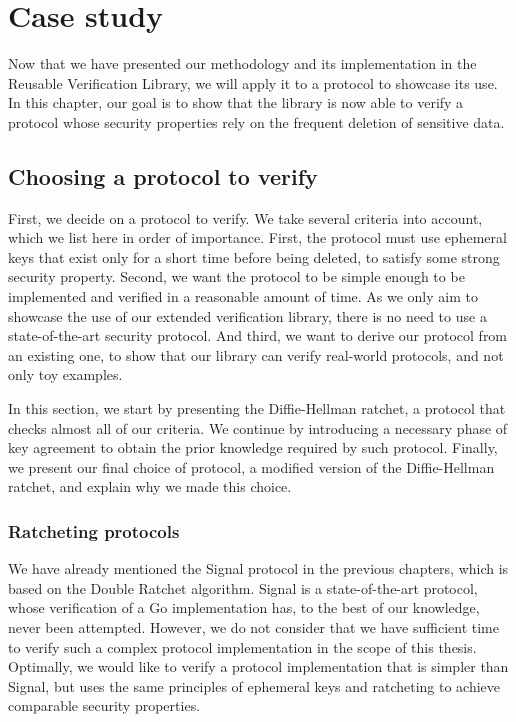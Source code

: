 
\chapter{Case study}
\label{chap:case-study}

Now that we have presented our methodology and its implementation in the Reusable Verification Library, we will apply it to a protocol to showcase its use. 
In this chapter, our goal is to show that the library is now able to verify a protocol whose security properties rely on the frequent deletion of sensitive data.


\section{Choosing a protocol to verify}
\label{sec:choosing-a-protocol-to-verify}

First, we decide on a protocol to verify.
We take several criteria into account, which we list here in order of importance.
First, the protocol must use ephemeral keys that exist only for a short time before being deleted, to satisfy some strong security property.
Second, we want the protocol to be simple enough to be implemented and verified in a reasonable amount of time. As we only aim to showcase the use of our extended verification library, there is no need to use a state-of-the-art security protocol.
And third, we want to derive our protocol from an existing one, to show that our library can verify real-world protocols, and not only toy examples.

In this section, we start by presenting the Diffie-Hellman ratchet, a protocol that checks almost all of our criteria. 
We continue by introducing a necessary phase of key agreement to obtain the prior knowledge required by such protocol.
Finally, we present our final choice of protocol, a modified version of the Diffie-Hellman ratchet, and explain why we made this choice.

\subsection{Ratcheting protocols}
\label{sec:ratcheting-protocols}

We have already mentioned the Signal protocol in the previous chapters, which is based on the Double Ratchet algorithm.
Signal is a state-of-the-art protocol, whose verification of a Go implementation has, to the best of our knowledge, never been attempted.
However, we do not consider that we have sufficient time to verify such a complex protocol implementation in the scope of this thesis.
Optimally, we would like to verify a protocol implementation that is simpler than Signal, but uses the same principles of ephemeral keys and ratcheting to achieve comparable security properties.

